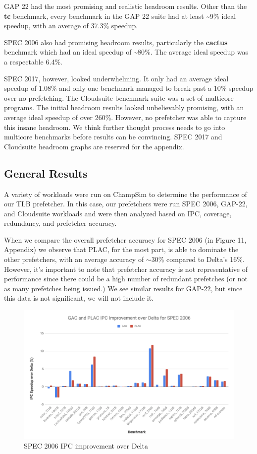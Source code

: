 \documentclass[conference]{IEEEtran}
\begin{document}
        GAP 22 had the most promising and realistic headroom results. Other than the \textbf{tc} benchmark, every benchmark in the GAP 22 suite had at least \textasciitilde{}9\% ideal speedup, with an average of 37.3\% speedup. 

        SPEC 2006 also had promising headroom results, particularly the \textbf{cactus} benchmark which had an ideal speedup of \textasciitilde{}80\%. The average ideal speedup was a respectable 6.4\%.

        SPEC 2017, however, looked underwhelming. It only had an average ideal speedup of 1.08\% and only one benchmark managed to break past a 10\% speedup over no prefetching. The Cloudsuite benchmark suite was a set of multicore programs. The initial headroom results looked unbelievably promising, with an average ideal speedup of over 260\%. However, no prefetcher was able to capture this insane headroom. We think further thought process needs to go into multicore benchmarks before results can be convincing. SPEC 2017 and Cloudsuite headroom graphs are reserved for the appendix.
    
    
    \subsection{General Results}

    A variety of workloads were run on ChampSim to determine the performance of our TLB prefetcher. In this case, our prefetchers were run SPEC 2006, GAP-22, and Cloudsuite workloads and were then analyzed based on IPC, coverage, redundancy, and prefetcher accuracy. 
    
    When we compare the overall prefetcher accuracy for SPEC 2006 (in Figure 11, Appendix) we observe that PLAC, for the most part, is able to dominate the other prefetchers, with an average accuracy of $\sim$30\% compared to Delta's 16\%. However, it's important to note that prefetcher accuracy is not representative of performance since there could be a high number of redundant prefetches (or not as many prefetches being issued.) We see similar results for GAP-22, but since this data is not significant, we will not include it.
    
    \begin{figure}[h]
        \centering
            \includegraphics[width=.95\textwidth]{ipc_spec2006.png}
        \caption{SPEC 2006 IPC improvement over Delta}
    \end{figure}
    
\end{document}

